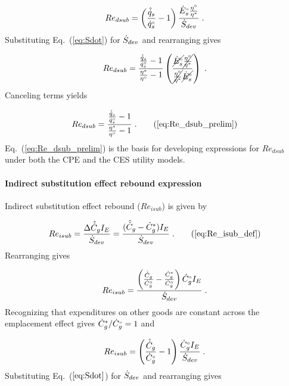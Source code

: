 \begin{equation}
  Re_{dsub} = \left( \frac{\hat{\dot{q}}_s}{{}{\dot{q}}^{\scriptscriptstyle \circ}_s} - 1  \right)
              \frac{{}{\dot{E}}^{\scriptscriptstyle \circ}_s \frac{{}{\eta}^{\scriptscriptstyle \circ}}{{\eta}^*}}{\dot{S}_{dev}} \; .
\end{equation}
%
Substituting Eq.~(\ref{eq:Sdot}) for $\dot{S}_{dev}$ and rearranging gives

\begin{equation}
  Re_{dsub} = \frac{\frac{\hat{\dot{q}}_s}{{}{\dot{q}}^{\scriptscriptstyle \circ}_s} - 1}{\frac{{\eta}^*}{{}{\eta}^{\scriptscriptstyle \circ}} - 1}
              \left( \frac{\cancel{{}{\dot{E}}^{\scriptscriptstyle \circ}_s} \cancel{\frac{{}{\eta}^{\scriptscriptstyle \circ}}{{\eta}^*}}    }{  \cancel{\frac{{}{\eta}^{\scriptscriptstyle \circ}}{{\eta}^*}}    \cancel{{}{\dot{E}}^{\scriptscriptstyle \circ}_s}} \right) \; .
\end{equation}
%
Canceling terms yields

\begin{equation}
  Re_{dsub} = \frac{\frac{\rasub{q}_s}{\rbempl{q}_s} - 1}{\frac{\aempl{\eta}}{\bempl{\eta}} - 1} \; .
                                                               \tag{\ref{eq:Re_dsub_prelim}}
\end{equation}
%
Eq.~(\ref{eq:Re_dsub_prelim}) is the basis for developing
expressions for $Re_{dsub}$
under both the CPE and the CES utility models.


\paragraph{Indirect substitution effect rebound expression}
\label{sec:Reisub_expression}

Indirect substitution effect rebound ($Re_{isub}$) is given by

\begin{equation}
  Re_{isub} = \frac{\Delta \rasub{C}_g I_E}{\Sdot} = \frac{(\rasub{C}_g - \rbsub{C}_g) I_E}{\Sdot} \; . \tag{\ref{eq:Re_isub_def}}
\end{equation}
%
Rearranging gives

\begin{equation}
  Re_{isub} = \frac{\left(\frac{\hat{\dot{C}}_g}{{}{\dot{C}}^{\scriptscriptstyle \circ}_g} - \frac{{\dot{C}}^*_g}{{}{\dot{C}}^{\scriptscriptstyle \circ}_g}  \right) {}{\dot{C}}^{\scriptscriptstyle \circ}_g I_E }{\dot{S}_{dev}} \; .
\end{equation}
%
Recognizing that expenditures on other goods are constant across the emplacement effect gives
${\dot{C}}^*_g/{}{\dot{C}}^{\scriptscriptstyle \circ}_g = 1$ and

\begin{equation}
  Re_{isub} = \left(\frac{\hat{\dot{C}}_g}{{}{\dot{C}}^{\scriptscriptstyle \circ}_g} - 1  \right) \frac{{}{\dot{C}}^{\scriptscriptstyle \circ}_g I_E }{\dot{S}_{dev}} \; .
\end{equation}
%
Substituting Eq.~($\ref{eq:Sdot}$) for $\dot{S}_{dev}$ and rearranging gives

